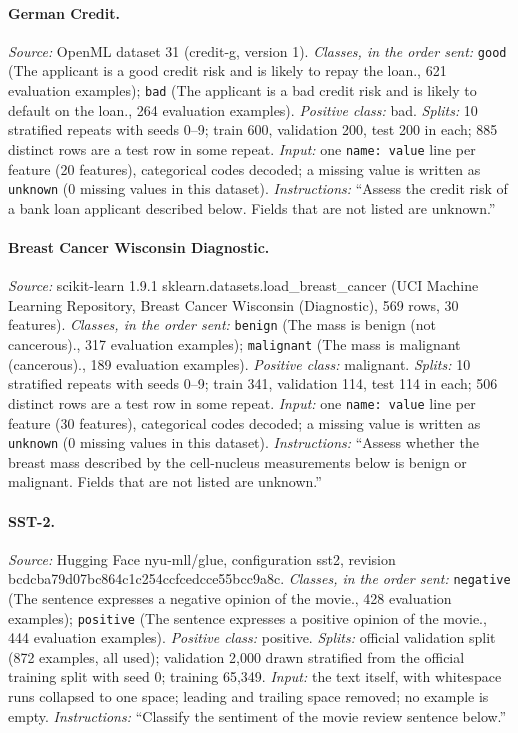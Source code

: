 \paragraph{German Credit.} \emph{Source:} OpenML dataset 31 (credit-g, version 1). \emph{Classes, in the order sent:} \texttt{good} (The applicant is a good credit risk and is likely to repay the loan., 621 evaluation examples); \texttt{bad} (The applicant is a bad credit risk and is likely to default on the loan., 264 evaluation examples). \emph{Positive class:} bad. \emph{Splits:} 10 stratified repeats with seeds 0--9; train 600, validation 200, test 200 in each; 885 distinct rows are a test row in some repeat. \emph{Input:} one \texttt{name: value} line per feature (20 features), categorical codes decoded; a missing value is written as \texttt{unknown} (0 missing values in this dataset). \emph{Instructions:} ``Assess the credit risk of a bank loan applicant described below. Fields that are not listed are unknown.''

\paragraph{Breast Cancer Wisconsin Diagnostic.} \emph{Source:} scikit-learn 1.9.1 sklearn.datasets.load\_breast\_cancer (UCI Machine Learning Repository, Breast Cancer Wisconsin (Diagnostic), 569 rows, 30 features). \emph{Classes, in the order sent:} \texttt{benign} (The mass is benign (not cancerous)., 317 evaluation examples); \texttt{malignant} (The mass is malignant (cancerous)., 189 evaluation examples). \emph{Positive class:} malignant. \emph{Splits:} 10 stratified repeats with seeds 0--9; train 341, validation 114, test 114 in each; 506 distinct rows are a test row in some repeat. \emph{Input:} one \texttt{name: value} line per feature (30 features), categorical codes decoded; a missing value is written as \texttt{unknown} (0 missing values in this dataset). \emph{Instructions:} ``Assess whether the breast mass described by the cell-nucleus measurements below is benign or malignant. Fields that are not listed are unknown.''

\paragraph{SST-2.} \emph{Source:} Hugging Face nyu-mll/\allowbreak{}glue, configuration sst2, revision bcdcba79\allowbreak{}d07bc864\allowbreak{}c1c254cc\allowbreak{}fcedcce5\allowbreak{}5bcc9a8c. \emph{Classes, in the order sent:} \texttt{negative} (The sentence expresses a negative opinion of the movie., 428 evaluation examples); \texttt{positive} (The sentence expresses a positive opinion of the movie., 444 evaluation examples). \emph{Positive class:} positive. \emph{Splits:} official validation split (872 examples, all used); validation 2{,}000 drawn stratified from the official training split with seed 0; training 65{,}349. \emph{Input:} the text itself, with whitespace runs collapsed to one space; leading and trailing space removed; no example is empty. \emph{Instructions:} ``Classify the sentiment of the movie review sentence below.''

